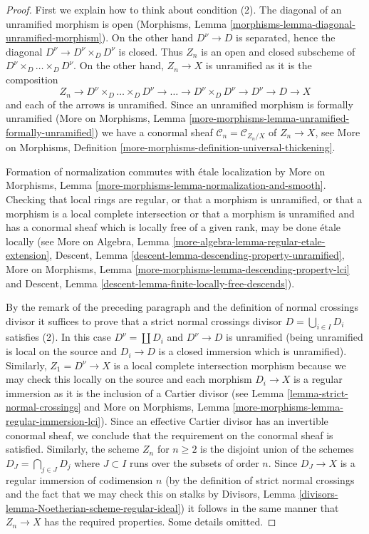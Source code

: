 \documentclass{stacks-project}
\theoremstyle{plain}
\theoremstyle{definition}
\theoremstyle{remark}
\numberwithin{equation}{subsection}
\begin{document}
\begin{proof}
First we explain how to think about condition (2).
The diagonal of an unramified morphism is open
(Morphisms, Lemma \ref{morphisms-lemma-diagonal-unramified-morphism}).
On the other hand $D^\nu \to D$ is separated, hence the
diagonal $D^\nu \to D^\nu \times_D D^\nu$ is closed.
Thus $Z_n$ is an open and closed subscheme of
$D^\nu \times_D \ldots \times_D D^\nu$. On the other hand,
$Z_n \to X$ is unramified as it is the composition
$$
Z_n \to D^\nu \times_D \ldots \times_D D^\nu \to \ldots \to
D^\nu \times_D D^\nu \to D^\nu \to D \to X
$$
and each of the arrows is unramified.
Since an unramified morphism is formally unramified
(More on Morphisms, Lemma
\ref{more-morphisms-lemma-unramified-formally-unramified})
we have a conormal sheaf
$\mathcal{C}_n = \mathcal{C}_{Z_n/X}$ of $Z_n \to X$, see
More on Morphisms, Definition
\ref{more-morphisms-definition-universal-thickening}.

\medskip\noindent
Formation of normalization commutes with \'etale localization by
More on Morphisms, Lemma \ref{more-morphisms-lemma-normalization-and-smooth}.
Checking that local rings are regular, or that
a morphism is unramified, or that a morphism is a
local complete intersection or that a morphism is
unramified and has a conormal sheaf which is
locally free of a given rank, may be done \'etale locally (see
More on Algebra, Lemma \ref{more-algebra-lemma-regular-etale-extension},
Descent, Lemma \ref{descent-lemma-descending-property-unramified},
More on Morphisms, Lemma \ref{more-morphisms-lemma-descending-property-lci}
and
Descent, Lemma \ref{descent-lemma-finite-locally-free-descends}).

\medskip\noindent
By the remark of the preceding paragraph and the definition
of normal crossings divisor it suffices to prove that a
strict normal crossings divisor $D = \bigcup_{i \in I} D_i$
satisfies (2). In this case $D^\nu = \coprod D_i$
and $D^\nu \to D$ is unramified (being unramified
is local on the source and $D_i \to D$ is a closed
immersion which is unramified). Similarly, $Z_1 = D^\nu \to X$
is a local complete intersection morphism because we may
check this locally on the source and each morphism $D_i \to X$
is a regular immersion as it is the inclusion of a Cartier divisor
(see Lemma \ref{lemma-strict-normal-crossings} and
More on Morphisms, Lemma \ref{more-morphisms-lemma-regular-immersion-lci}).
Since an effective Cartier divisor has an invertible
conormal sheaf, we conclude that the requirement on the
conormal sheaf is satisfied.
Similarly, the scheme $Z_n$ for $n \geq 2$ is the disjoint union
of the schemes $D_J = \bigcap_{j \in J} D_j$ where $J \subset I$
runs over the subsets of order $n$. Since $D_J \to X$ is
a regular immersion of codimension $n$
(by the definition of strict normal crossings and the
fact that we may check this on stalks by
Divisors, Lemma \ref{divisors-lemma-Noetherian-scheme-regular-ideal})
it follows in the same manner that $Z_n \to X$ has the required
properties. Some details omitted.


\end{proof}
\end{document}
